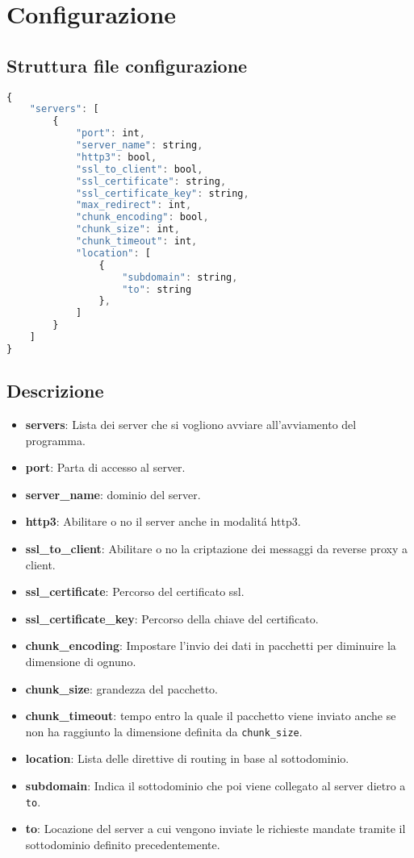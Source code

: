 \section{Configurazione}

\subsection{Struttura file configurazione}
\begin{lstlisting}[language=Javascript]
  {
    "servers": [
        {
            "port": int,
            "server_name": string,
            "http3": bool,
            "ssl_to_client": bool,
            "ssl_certificate": string,
            "ssl_certificate_key": string,
            "max_redirect": int,
            "chunk_encoding": bool,
            "chunk_size": int,
            "chunk_timeout": int,
            "location": [
                {
                    "subdomain": string,
                    "to": string
                },
            ]
        }
    ]
}
\end{lstlisting}
\subsection{Descrizione}
\begin{itemize}[label={}]
  \item \textbf{servers}: Lista dei server che si vogliono avviare all'avviamento del programma.
  \item \textbf{port}: Parta di accesso al server.
  \item \textbf{server\_name}: dominio del server.
  \item \textbf{http3}: Abilitare o no il server anche in modalitá http3.
  \item \textbf{ssl\_to\_client}: Abilitare o no la criptazione dei messaggi da reverse proxy a client.
  \item \textbf{ssl\_certificate}: Percorso del certificato ssl.
  \item \textbf{ssl\_certificate\_key}: Percorso della chiave del certificato.
  \item \textbf{chunk\_encoding}: Impostare l'invio dei dati in pacchetti per diminuire la dimensione di ognuno.
  \item \textbf{chunk\_size}: grandezza del pacchetto.
  \item \textbf{chunk\_timeout}: tempo entro la quale il pacchetto viene inviato anche se non ha raggiunto la dimensione definita da \texttt{chunk\_size}.
  \item \textbf{location}: Lista delle direttive di routing in base al sottodominio.
  \item \textbf{subdomain}: Indica il sottodominio che poi viene collegato al server dietro a \texttt{to}.
  \item \textbf{to}: Locazione del server a cui vengono inviate le richieste mandate tramite il sottodominio definito precedentemente.
\end{itemize}

